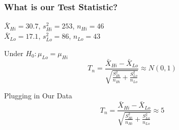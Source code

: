 \documentclass[handout]{beamer}
\begin{document}
\begin{frame}
\frametitle{What is our Test Statistic?}
\footnotesize
$\bar{X}_{Hi} = 30.7$, $s^2_{Hi} = 253$, $n_{Hi} = 46$\\
$\bar{X}_{Lo} = 17.1$, $s^2_{Lo} = 86$, $n_{Lo} = 43$\\
\normalsize
\vspace{2em}

\begin{block}{Under $H_0\colon \mu_{Lo} = \mu_{Hi}$}
	$$T_n = \frac{\bar{X}_{Hi} - \bar{X}_{Lo}}{\sqrt{\frac{S_{Hi}^2}{n_{Hi}} + \frac{S_{Lo}^2}{n_{Lo}}}} \approx N(0,1)$$
\end{block}

\begin{block}{Plugging in Our Data}
$$T_n = \frac{\bar{X}_{Hi} - \bar{X}_{Lo}}{\sqrt{\frac{S_{Hi}^2}{n_{Hi}} + \frac{S_{Lo}^2}{n_{Lo}}}} \approx 5$$
\end{block}
\end{frame}
\end{document}
